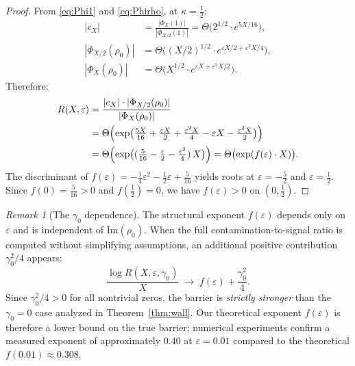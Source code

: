 \documentclass[12pt]{article}
\theoremstyle{remark}
\newtheorem{remark}[theorem]{Remark}
\begin{document}
\begin{proof}
From \eqref{eq:Phi1} and \eqref{eq:Phirho}, at $\kappa = \tfrac{1}{2}$:
\begin{align}
|c_X| &= \frac{|\Phi_X(1)|}{|\Phi_{X/2}(1)|}
  = \Theta\bigl(2^{1/2} \cdot e^{5X/16}\bigr), \label{eq:cX_proof}\\
|\Phi_{X/2}(\rho_0)| &= \Theta\bigl((X/2)^{1/2} \cdot
  e^{\varepsilon X/2 + \varepsilon^2 X/4}\bigr), \label{eq:Phi_ref}\\
|\Phi_X(\rho_0)| &= \Theta\bigl(X^{1/2} \cdot
  e^{\varepsilon X + \varepsilon^2 X/2}\bigr). \label{eq:Phi_main}
\end{align}
Therefore:
\begin{align}
R(X,\varepsilon)
&= \frac{|c_X| \cdot |\Phi_{X/2}(\rho_0)|}{|\Phi_X(\rho_0)|} \notag\\
&= \Theta\Bigl(\exp\bigl(\tfrac{5X}{16}
  + \tfrac{\varepsilon X}{2} + \tfrac{\varepsilon^2 X}{4}
  - \varepsilon X - \tfrac{\varepsilon^2 X}{2}\bigr)\Bigr) \notag\\
&= \Theta\Bigl(\exp\bigl((\tfrac{5}{16}
  - \tfrac{\varepsilon}{2} - \tfrac{\varepsilon^2}{4})\,X\bigr)\Bigr)
  = \Theta\bigl(\exp(f(\varepsilon)\cdot X)\bigr).
\end{align}
The discriminant of $f(\varepsilon) = -\tfrac{1}{4}\varepsilon^2
- \tfrac{1}{2}\varepsilon + \tfrac{5}{16}$ yields roots at
$\varepsilon = -\tfrac{5}{2}$ and $\varepsilon = \tfrac{1}{2}$.
Since $f(0) = \tfrac{5}{16} > 0$ and $f(\tfrac{1}{2}) = 0$,
we have $f(\varepsilon) > 0$ on $(0,\tfrac{1}{2})$.
\end{proof}

\begin{remark}[The $\gamma_0$ dependence]\label{rem:gamma0}
The structural exponent $f(\varepsilon)$ depends only on $\varepsilon$
and is independent of $\mathrm{Im}(\rho_0)$. When the full
contamination-to-signal ratio is computed without simplifying assumptions,
an additional positive contribution $\gamma_0^2/4$ appears:
\[
\frac{\log R(X,\varepsilon,\gamma_0)}{X}
\;\to\; f(\varepsilon) + \frac{\gamma_0^2}{4}.
\]
Since $\gamma_0^2/4 > 0$ for all nontrivial zeros, the barrier is
\emph{strictly stronger} than the $\gamma_0 = 0$ case analyzed in
Theorem~\ref{thm:wall}. Our theoretical exponent $f(\varepsilon)$ is
therefore a lower bound on the true barrier; numerical experiments
confirm a measured exponent of approximately $0.40$ at $\varepsilon = 0.01$
compared to the theoretical $f(0.01) \approx 0.308$.
\end{remark}
\end{document}
